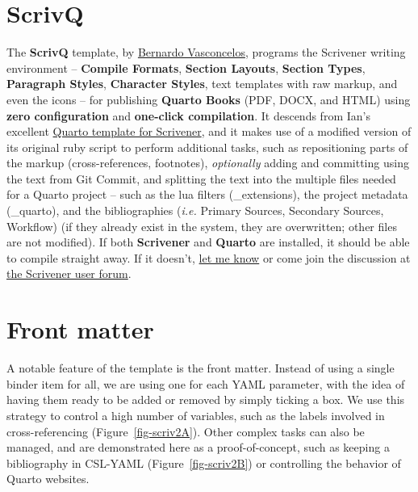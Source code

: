 \documentclass[
  12pt,
  a4paper,
  oneside,
  titlepage,
  toclink=all,
  toc=bibliography]{scrbook}
\author{}
\date{}
\renewcommand*\contentsname{Table of contents}
\newcommand\contentsname{Table of contents}
\theoremstyle{definition}
\theoremstyle{plain}
\theoremstyle{plain}
\theoremstyle{plain}
\theoremstyle{plain}
\theoremstyle{definition}
\theoremstyle{definition}
\theoremstyle{plain}
\theoremstyle{remark}
\begin{document}
\frontmatter
\renewcommand*\contentsname{Table of contents}
{
\setcounter{tocdepth}{2}
\tableofcontents
}
\listoffigures
\listoftables
\mainmatter
\hypertarget{sec-scriv1}{%
\chapter{ScrivQ}\label{sec-scriv1}}

\protect\hypertarget{scriv1}{}{}

The \textbf{ScrivQ} template, by
\href{https://github.com/sponsors/bcdavasconcelos}{Bernardo
Vasconcelos}, programs the Scrivener writing environment --
\textbf{Compile Formats}, \textbf{Section Layouts}, \textbf{Section
Types}, \textbf{Paragraph Styles}, \textbf{Character Styles}, text
templates with raw markup, and even the icons -- for publishing
\textbf{Quarto Books} (PDF, DOCX, and HTML) using \textbf{zero
configuration} and \textbf{one-click compilation}. It descends from
Ian's excellent
\href{forum.literatureandlatte.com/t/scrivener-quarto-a-technical-academic-publishing-workflow/129769}{Quarto
template for Scrivener}, and it makes use of a modified version of its
original ruby script to perform additional tasks, such as repositioning
parts of the markup (cross-references, footnotes), \emph{optionally}
adding and committing using the text from Git Commit, and splitting the
text into the multiple files needed for a Quarto project -- such as the
lua filters (\_extensions), the project metadata (\_quarto), and the
bibliographies (\emph{i.e.} Primary Sources, Secondary Sources,
Workflow) (if they already exist in the system, they are overwritten;
other files are not modified). If both \textbf{Scrivener} and
\textbf{Quarto} are installed, it should be able to compile straight
away. If it doesn't,
\href{https://github.com/bcdavasconcelos/scrivq/issues/new/choose}{let
me know} or come join the discussion at
\href{forum.literatureandlatte.com/t/134755}{the Scrivener user forum}.

\hypertarget{sec-scriv2}{%
\chapter{Front matter}\label{sec-scriv2}}

\protect\hypertarget{scriv2}{}{}

A notable feature of the template is the front matter. Instead of using
a single binder item for all, we are using one for each YAML parameter,
with the idea of having them ready to be added or removed by simply
ticking a box. {}We use this
strategy to control a high number of variables, such as the labels
involved in cross-referencing
(\protect\hypertarget{cite_1}{}{\label{cite_1}Figure~\ref{fig-scriv2A}}).
Other complex tasks can also be managed, and are demonstrated here as a
proof-of-concept, such as keeping a bibliography in CSL-YAML
(\protect\hypertarget{cite_2}{}{\label{cite_2}Figure~\ref{fig-scriv2B}})
or controlling the behavior of Quarto websites.
\end{document}

